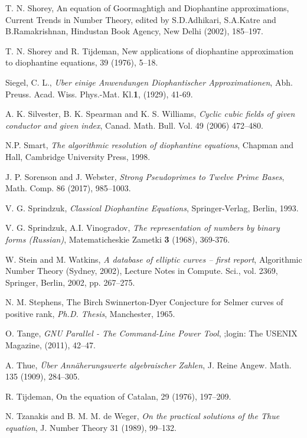 \begin{thebibliography}{}
T. N. Shorey,
\newblock An equation of Goormaghtigh and Diophantine approximations,
\newblock Current Trends in Number Theory, edited by S.D.Adhikari, S.A.Katre and B.Ramakrishnan, Hindustan Book Agency, New Delhi (2002), 185--197.

T. N. Shorey and R. Tijdeman,
\newblock New applications of diophantine approximation to diophantine equations,
 39 (1976), 5--18.

Siegel, C. L.,
\emph{\:Uber einige Anwendungen Diophantischer Approximationen},
Abh. Preuss. Acad. Wiss. Phys.-Mat. Kl.\textbf{1}, (1929), 41-69.

A. K. Silvester, B. K. Spearman and K. S. Williams,
\emph{Cyclic cubic fields of given conductor
and given index}, Canad. Math. Bull. Vol. 49 (2006)  472--480.

N.P. Smart, 
\emph{The algorithmic resolution of diophantine equations}, 
Chapman and Hall, Cambridge University Press, 1998.

 J. P. Sorenson and J. Webster, 
  \emph{Strong Pseudoprimes to Twelve 
Prime Bases}, Math. Comp. 86 (2017), 985--1003.

V. G. Sprindzuk,
\emph{Classical Diophantine Equations},
Springer-Verlag, Berlin, 1993.

V. G. Sprindzuk,  A.I. Vinogradov,
\emph{The representation of numbers by binary forms (Russian)},
Matematicheskie Zametki \textbf{3} (1968), 369-376.

W. Stein and M. Watkins,
\emph{A database of elliptic curves -- first report},
Algorithmic Number Theory (Sydney, 2002), Lecture Notes in Compute. Sci., vol. 2369, 
Springer, Berlin, 2002, pp. 267--275.
  
N. M. Stephens, 
The Birch Swinnerton-Dyer Conjecture for Selmer
curves of positive rank,
\emph{Ph.D. Thesis}, Manchester, 1965.

O. Tange,
\emph{GNU Parallel - The Command-Line Power Tool},
;login: The USENIX Magazine, (2011), 42--47.

A. Thue,
\emph{\"Uber Ann\"aherungswerte algebraischer Zahlen},
J. Reine Angew. Math. 135 (1909), 284--305.

R. Tijdeman,
\newblock On the equation of Catalan, 
 29 (1976), 197--209.

N. Tzanakis and B. M. M. de Weger,
\emph{On the practical solutions of the Thue equation},
J. Number Theory 31 (1989), 99--132.


\end{thebibliography}
